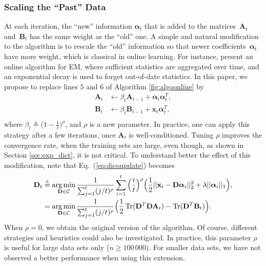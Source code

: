 \documentclass[twoside,11pt]{article}
\def\x{{\mathbf x}}
\def\alphab{{\boldsymbol\alpha}}
\def\D{{\mathbf D}}
\def\B{{\mathbf B}}
\def\C{{\mathcal C}}
\def\A{{\mathbf A}}
\def\argmin{\operatornamewithlimits{arg\,min}}
\def\trace{\operatorname{Tr}}
\def\defin{\stackrel{\vartriangle}{=}}
\begin{document}
\subsubsection{Scaling the ``Past'' Data}
At each iteration, the ``new'' information
$\alphab_t$ that is added to the matrices~$\A_t$ and~$\B_t$ has the same weight as the ``old'' one. A simple and
natural modification to the algorithm is to rescale the ``old'' information
so that newer coefficients~$\alphab_t$ have more weight, which 
is classical in online learning. For instance,
\citet{neal} present an online algorithm for EM, where sufficient statistics
are aggregated over time, and an exponential decay is used to forget
out-of-date statistics.
In this paper, we propose to
replace lines $5$ and $6$ of Algorithm \ref{fig:algoonline} by
\begin{displaymath}
\begin{split}
   \A_t & \leftarrow \beta_t \A_{t-1} + \alphab_{t}\alphab_{t}^T, \\
\B_t & \leftarrow \beta_t \B_{t-1} + \x_t\alphab_{t}^T, \\
\end{split}
\end{displaymath}
where $\beta_t \defin \big(1-\frac{1}{t}\big)^\rho$,
and $\rho$ is a new parameter.
In practice, one can apply this strategy after a few iterations, once $\A_t$
is well-conditioned. Tuning $\rho$
improves the convergence
rate, when the training sets are large, even though, as shown in
Section \ref{sec:exp_dict}, it is not critical.  To understand better the effect
of this modification, note that Eq.~(\ref{eq:dicoupdate}) becomes
\begin{displaymath}
   \begin{split}
   \D_t  &\defin \argmin_{\D \in \C} \frac{1}{\sum_{j=1}^t ( j/t)^\rho}\sum_{i=1}^t
   \Big(\frac{i}{t}\Big)^\rho\Big(\frac{1}{2}||\x_i-\D\alphab_i||_2^2 + \lambda||\alphab_i||_1\Big), \\
   &= \argmin_{\D \in \C} \frac{1}{\sum_{j=1}^t ( j/t)^\rho  }\Big( \frac{1}{2}\trace(\D^T\D\A_t) - \trace(\D^T\B_t)\Big).
\end{split}
\end{displaymath}
When $\rho=0$, we obtain the original version of the algorithm. Of course,
different strategies and heuristics could also be investigated.
In practice, this parameter $\rho$ is useful for large data sets only ($n \geq 100\,000$).
For smaller data sets, we have not observed a better performance when using 
this extension.
\end{document}
